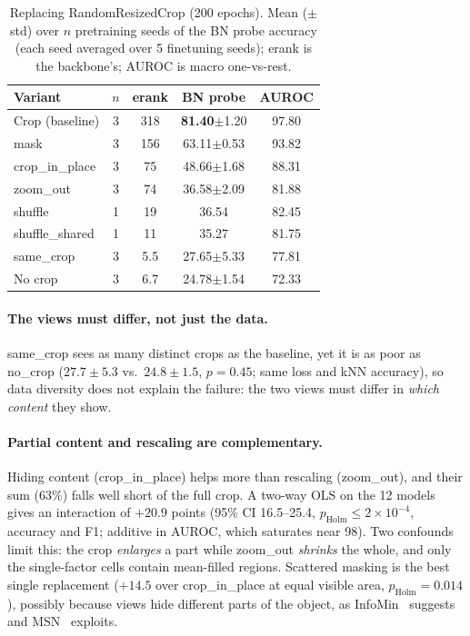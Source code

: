 \documentclass[10pt,twocolumn,letterpaper]{article}
\newcommand{\pmstd}[1]{{\scriptsize$\pm$#1}}
\begin{document}
\begin{table}[t]
\centering
\small
\setlength\tabcolsep{3pt}
\begin{tabular}{lcccc}
\toprule
Variant & $n$ & erank & BN probe & AUROC \\
\midrule
Crop (baseline) & 3 & 318 & \textbf{81.40}\pmstd{1.20} & 97.80 \\
mask & 3 & 156 & 63.11\pmstd{0.53} & 93.82 \\
crop\_in\_place & 3 & 75 & 48.66\pmstd{1.68} & 88.31 \\
zoom\_out & 3 & 74 & 36.58\pmstd{2.09} & 81.88 \\
shuffle & 1 & 19 & 36.54 & 82.45 \\
shuffle\_shared & 1 & 11 & 35.27 & 81.75 \\
same\_crop & 3 & 5.5 & 27.65\pmstd{5.33} & 77.81 \\
No crop & 3 & 6.7 & 24.78\pmstd{1.54} & 72.33 \\
\bottomrule
\end{tabular}
\caption{Replacing RandomResizedCrop (200 epochs). Mean (\pmstd{std}) over $n$ pretraining seeds of the BN probe accuracy (each seed averaged over 5 finetuning seeds); erank is the backbone's; AUROC is macro one-vs-rest.}
\label{tab:crop}
\end{table}

\paragraph{The views must differ, not just the data.}
same\_crop sees as many distinct crops as the baseline, yet it is as poor as no\_crop ($27.7\pm5.3$ vs.\ $24.8\pm1.5$, $p{=}0.45$; same loss and kNN accuracy), so data diversity does not explain the failure: the two views must differ in \emph{which content} they show.

\paragraph{Partial content and rescaling are complementary.}
Hiding content (crop\_in\_place) helps more than rescaling (zoom\_out), and their sum (63\%) falls well short of the full crop. A two-way OLS on the 12 models gives an interaction of $+20.9$ points (95\% CI 16.5--25.4, $p_\text{Holm}\le2\!\times\!10^{-4}$, accuracy and F1; additive in AUROC, which saturates near 98). Two confounds limit this: the crop \emph{enlarges} a part while zoom\_out \emph{shrinks} the whole, and only the single-factor cells contain mean-filled regions.
Scattered masking is the best single replacement ($+14.5$ over crop\_in\_place at equal visible area, $p_\text{Holm}{=}0.014$), possibly because views hide different parts of the object, as InfoMin~\cite{tian2020infomin} suggests and MSN~\cite{assran2022msn} exploits.
\end{document}
